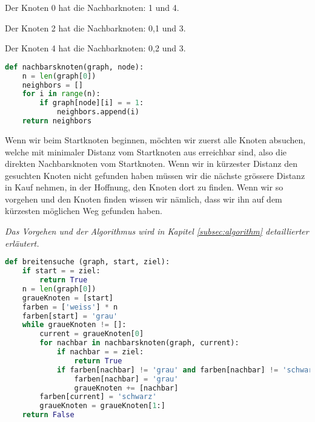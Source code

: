 \begin{lsg}
Der Knoten 0 hat die Nachbarknoten: 1 und 4.

Der Knoten 2 hat die Nachbarknoten: 0,1 und 3.

Der Knoten 4 hat die Nachbarknoten: 0,2 und 3.

\end{lsg}


\begin{lsg}
\hfill
\begin{lstlisting}[language=Python,basicstyle=\small,tabsize=3]
def nachbarsknoten(graph, node):
	n = len(graph[0])
	neighbors = []
	for i in range(n):
		if graph[node][i] = = 1:
			neighbors.append(i)
	return neighbors
\end{lstlisting}
\end{lsg}





\begin{lsg}
Wenn wir beim Startknoten beginnen, m\"ochten wir zuerst alle Knoten absuchen, welche mit minimaler Distanz vom Startknoten aus erreichbar sind, also die direkten Nachbarsknoten vom Startknoten. Wenn wir in k\"urzester Distanz den gesuchten Knoten nicht gefunden haben m\"ussen wir die n\"achste gr\"ossere Distanz in Kauf nehmen, in der Hoffnung, den Knoten dort zu finden. Wenn wir so vorgehen und den Knoten finden wissen wir n\"amlich, dass wir ihn auf dem k\"urzesten m\"oglichen Weg gefunden haben.

\textit{Das Vorgehen und der Algorithmus wird in Kapitel \ref{subsec:algorithm} detaillierter erl\"autert.}
\end{lsg}

\begin{lsg}
\hfill
\begin{lstlisting}[language=Python,basicstyle=\small,tabsize=3]
def breitensuche (graph, start, ziel):
	if start = = ziel:
		return True
	n = len(graph[0])
	graueKnoten = [start]
	farben = ['weiss'] * n
	farben[start] = 'grau'
	while graueKnoten != []:
		current = graueKnoten[0]
		for nachbar in nachbarsknoten(graph, current):
			if nachbar = = ziel:
				return True
			if farben[nachbar] != 'grau' and farben[nachbar] != 'schwarz':
				farben[nachbar] = 'grau'
				graueKnoten += [nachbar]
		farben[current] = 'schwarz'
		graueKnoten = graueKnoten[1:]
	return False
\end{lstlisting}
\end{lsg}

